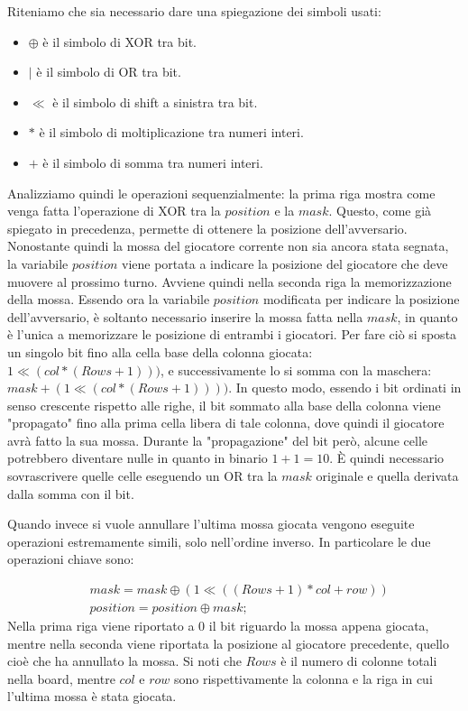 \documentclass[a4paper]{article}
\begin{document}
Riteniamo che sia necessario dare una spiegazione dei simboli usati:
\begin{itemize}
  \item $\oplus$ è il simbolo di XOR tra bit.
  \item $|$ è il simbolo di OR tra bit.
  \item $\ll$ è il simbolo di shift a sinistra tra bit.
  \item $*$ è il simbolo di moltiplicazione tra numeri interi.
  \item $+$ è il simbolo di somma tra numeri interi.
\end{itemize}
Analizziamo quindi le operazioni sequenzialmente: la prima riga mostra come
venga fatta l'operazione di XOR tra la $position$ e la $mask$. Questo, come già
spiegato in precedenza, permette di ottenere la posizione dell'avversario. 
Nonostante quindi la mossa del giocatore corrente non sia ancora stata segnata, 
la variabile $position$ viene portata a indicare la posizione del giocatore che 
deve muovere al prossimo turno. Avviene quindi nella seconda riga la 
memorizzazione della mossa. Essendo ora la variabile $position$ modificata per
indicare la posizione dell'avversario, è soltanto necessario inserire la mossa
fatta nella $mask$, in quanto è l'unica a memorizzare le posizione di entrambi i 
giocatori. Per fare ciò si sposta un singolo bit fino alla cella base della 
colonna giocata: $1 \ll (col * (Rows + 1)))$, e successivamente lo si somma con
la maschera: $mask + (1 \ll (col * (Rows + 1))))$. In questo modo, essendo i
bit ordinati in senso crescente rispetto alle righe, il bit sommato alla base 
della colonna viene "propagato" fino alla prima cella libera di tale colonna, 
dove quindi il giocatore avrà fatto la sua mossa. Durante la "propagazione" del
bit però, alcune celle potrebbero diventare nulle in quanto in binario $1 + 1 = 
10$. È quindi necessario sovrascrivere quelle celle eseguendo un OR tra la 
$mask$ originale e quella derivata dalla somma con il bit.

Quando invece si vuole annullare l'ultima mossa giocata vengono eseguite operazioni
estremamente simili, solo nell'ordine inverso. In particolare le due operazioni
chiave sono:

\begin{align*}
  &mask = mask \oplus (1 \ll ((Rows + 1) * col + row))\\
  &position = position \oplus mask;
\end{align*}
Nella prima riga viene riportato a 0 il bit riguardo la mossa appena giocata,
mentre nella seconda viene riportata la posizione al giocatore precedente, 
quello cioè che ha annullato la mossa. Si noti che $Rows$ è il numero di colonne
totali nella board, mentre $col$ e $row$ sono rispettivamente la colonna e la
riga in cui l'ultima mossa è stata giocata.
\end{document}
